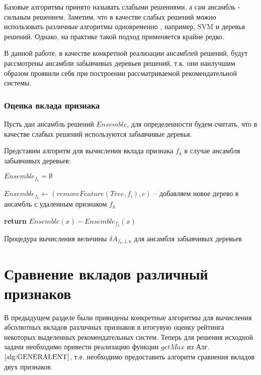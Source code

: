 \documentclass[12pt,a4paper]{report}
\begin{document}
Базовые алгоритмы принято называть $\textit{слабыми решениями}$, а сам ансамбль - $\textit{сильным решением}$.
Заметим, что в качестве слабых решений можно использовать различные алгоритмы одновременно , например, SVM и деревья решений. Однако, на практике такой подход применяется крайне редко.

В данной работе, в качестве конкретной реализации ансамблей решений, будут рассмотрены ансамбли забывчивых деревьев решений, т.к. они наилучшим образом проявили себя при построении рассматриваемой рекомендательной системы.

\subsubsection{Оценка вклада признака}
Пусть дан ансамбль решений $Ensemble$, для определенности будем считать, что в качестве слабых решений используются забывчивые деревья.

Представим алгоритм для вычисления вклада признака $f_k$ в случае ансамбля забывчивых деревьев:

\begin{algorithm}[H]
\SetAlgoLined
{}

$Ensemble_{f_k} = \emptyset$

 {

	$Ensemble_{f_k} \leftarrow (removeFeature(Tree, f_i), c)$ -- добавляем новое дерево в ансамбль с удаленным признаком $f_k$
	
}

\textbf{return} $Ensemble(x) - Ensemble_{f_k}(x)$
\caption{Процедура вычисления величины $\delta A_{f_k, j, u}$ для ансамбля забывчивых деревьев}
\label{alg:CFIOT}
\end{algorithm}

\section{Сравнение вкладов различный признаков}
В предыдущем разделе были привидены конкретные алгоритмы для вычисления абсолютных вкладов различных признаков в итогувую оценку рейтинга некоторых выделенных рекомендательных систем. Теперь для решения исходной задачи необходимо привести реализацию функции $getMax$ из Алг. $\ref{alg:GENERALENT}$, т.е. необходимо предоставить алгоритм сравнения вкладов двух признаков.
\end{document}
